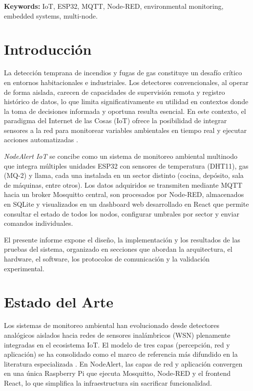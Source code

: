 \documentclass[11pt,a4paper]{article}
\begin{document}
\textbf{Keywords:} IoT, ESP32, MQTT, Node-RED, environmental monitoring, embedded systems, multi-node.

\section{Introducci\'on}
La detecci\'on temprana de incendios y fugas de gas constituye un desaf\'io cr\'itico en entornos habitacionales e industriales. Los detectores convencionales, al operar de forma aislada, carecen de capacidades de supervisi\'on remota y registro hist\'orico de datos, lo que limita significativamente su utilidad en contextos donde la toma de decisiones informada y oportuna resulta esencial. En este contexto, el paradigma del Internet de las Cosas (IoT) ofrece la posibilidad de integrar sensores a la red para monitorear variables ambientales en tiempo real y ejecutar acciones automatizadas \citep{rivera2024}.

\textit{NodeAlert IoT} se concibe como un sistema de monitoreo ambiental multinodo que integra m\'ultiples unidades ESP32 con sensores de temperatura (DHT11), gas (MQ-2) y llama, cada una instalada en un sector distinto (cocina, dep\'osito, sala de m\'aquinas, entre otros). Los datos adquiridos se transmiten mediante MQTT hacia un broker Mosquitto central, son procesados por Node-RED, almacenados en SQLite y visualizados en un dashboard web desarrollado en React que permite consultar el estado de todos los nodos, configurar umbrales por sector y enviar comandos individuales.

El presente informe expone el dise\~no, la implementaci\'on y los resultados de las pruebas del sistema, organizado en secciones que abordan la arquitectura, el hardware, el software, los protocolos de comunicaci\'on y la validaci\'on experimental.

\section{Estado del Arte}
Los sistemas de monitoreo ambiental han evolucionado desde detectores anal\'ogicos aislados hacia redes de sensores inal\'ambricos (WSN) plenamente integradas en el ecosistema IoT. El modelo de tres capas (percepci\'on, red y aplicaci\'on) se ha consolidado como el marco de referencia m\'as difundido en la literatura especializada \citep{rivera2024}. En NodeAlert, las capas de red y aplicaci\'on convergen en una \'unica Raspberry Pi que ejecuta Mosquitto, Node-RED y el frontend React, lo que simplifica la infraestructura sin sacrificar funcionalidad.
\end{document}
